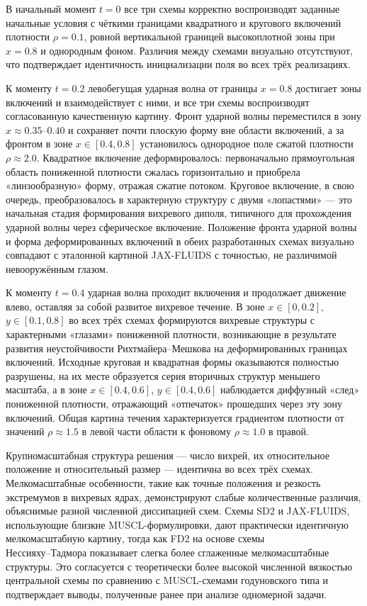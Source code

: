 \documentclass[a4paper,14pt]{extarticle}
\theoremstyle{theorem}
\theoremstyle{lemma}
\begin{document}
В начальный момент $t = 0$ все три схемы корректно воспроизводят заданные начальные условия с чёткими границами квадратного и кругового включений плотности $\rho = 0.1$, ровной вертикальной границей высокоплотной зоны при $x = 0.8$ и однородным фоном. Различия между схемами визуально отсутствуют, что подтверждает идентичность инициализации поля во всех трёх реализациях.

К моменту $t = 0.2$ левобегущая ударная волна от границы $x = 0.8$ достигает зоны включений и взаимодействует с ними, и все три схемы воспроизводят согласованную качественную картину. Фронт ударной волны переместился в зону $x \approx 0.35\text{--}0.40$ и сохраняет почти плоскую форму вне области включений, а за фронтом в зоне $x \in [0.4, 0.8]$ установилось однородное поле сжатой плотности $\rho \approx 2.0$. Квадратное включение деформировалось: первоначально прямоугольная область пониженной плотности сжалась горизонтально и приобрела «линзообразную» форму, отражая сжатие потоком. Круговое включение, в свою очередь, преобразовалось в характерную структуру с двумя «лопастями» --- это начальная стадия формирования вихревого диполя, типичного для прохождения ударной волны через сферическое включение. Положение фронта ударной волны и форма деформированных включений в обеих разработанных схемах визуально совпадают с эталонной картиной JAX-FLUIDS с точностью, не различимой невооружённым глазом.

К моменту $t = 0.4$ ударная волна проходит включения и продолжает движение влево, оставляя за собой развитое вихревое течение. В зоне $x \in [0, 0.2]$, $y \in [0.1, 0.8]$ во всех трёх схемах формируются вихревые структуры с характерными «глазами» пониженной плотности, возникающие в результате развития неустойчивости Рихтмайера--Мешкова на деформированных границах включений. Исходные круговая и квадратная формы оказываются полностью разрушены, на их месте образуется серия вторичных структур меньшего масштаба, а в зоне $x \in [0.4, 0.6]$, $y \in [0.4, 0.6]$ наблюдается диффузный «след» пониженной плотности, отражающий «отпечаток» прошедших через эту зону включений. Общая картина течения характеризуется градиентом плотности от значений $\rho \approx 1.5$ в левой части области к фоновому $\rho \approx 1.0$ в правой.

Крупномасштабная структура решения --- число вихрей, их относительное положение и относительный размер — идентична во всех трёх схемах. Мелкомасштабные особенности, такие как точные положения и резкость экстремумов в вихревых ядрах, демонстрируют слабые количественные различия, объяснимые разной численной диссипацией схем. Схемы SD2 и JAX-FLUIDS, использующие близкие MUSCL-формулировки, дают практически идентичную мелкомасштабную картину, тогда как FD2 на основе схемы \\ Нессияху--Тадмора показывает слегка более сглаженные мелкомасштабные структуры. Это согласуется с теоретически более высокой численной вязкостью центральной схемы по сравнению с MUSCL-схемами годуновского типа и подтверждает выводы, полученные ранее при анализе одномерной задачи.
\end{document}
